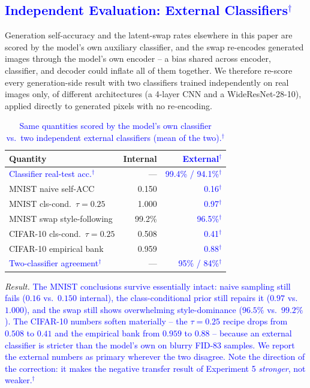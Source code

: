 \documentclass[10pt,letterpaper]{article}
\newcommand{\pj}[1]{\textcolor{blue}{#1$^{\dagger}$}}
\begin{document}
\subsection{\pj{Independent Evaluation: External Classifiers}}
\label{sec:exp1-ext}

Generation self-accuracy and the latent-swap rates elsewhere in this paper
are scored by the model's own auxiliary classifier, and the swap re-encodes
generated images through the model's own encoder -- a bias shared across
encoder, classifier, and decoder could inflate all of them together. We
therefore re-score every generation-side result with two classifiers trained
independently on real images only, of different architectures (a 4-layer CNN
and a WideResNet-28-10), applied directly to generated pixels with no
re-encoding.

\begin{table}[h]
\centering
\small
\setlength{\tabcolsep}{4pt}
\caption{\pj{Same quantities scored by the model's own classifier vs.\ two
         independent external classifiers (mean of the two).}}
\label{tab:external}
\begin{tabular}{lrr}
\toprule
Quantity & Internal & \pj{External} \\
\midrule
\pj{Classifier real-test acc.} & --- & \pj{99.4\% / 94.1\%} \\
\midrule
MNIST naive self-ACC          & 0.150 & \pj{0.16} \\
MNIST cls-cond.\ $\tau{=}0.25$ & 1.000 & \pj{0.97} \\
MNIST swap style-following    & 99.2\% & \pj{96.5\%} \\
CIFAR-10 cls-cond.\ $\tau{=}0.25$ & 0.508 & \pj{0.41} \\
CIFAR-10 empirical bank       & 0.959 & \pj{0.88} \\
\midrule
\pj{Two-classifier agreement} & --- & \pj{95\% / 84\%} \\
\bottomrule
\end{tabular}
\end{table}

\emph{Result.} \pj{The MNIST conclusions survive essentially intact: naive
sampling still fails ($0.16$ vs.\ $0.150$ internal), the class-conditional
prior still repairs it ($0.97$ vs.\ $1.000$), and the swap still shows
overwhelming style-dominance ($96.5\%$ vs.\ $99.2\%$). The CIFAR-10 numbers
soften materially -- the $\tau{=}0.25$ recipe drops from $0.508$ to $0.41$
and the empirical bank from $0.959$ to $0.88$ -- because an external
classifier is stricter than the model's own on blurry FID-$83$ samples. We
report the external numbers as primary wherever the two disagree. Note the
direction of the correction: it makes the negative transfer result of
Experiment 5 \emph{stronger}, not weaker.}
\end{document}
